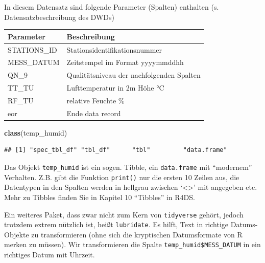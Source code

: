 \documentclass[]{book}
\newenvironment{Shaded}{\begin{snugshade}}{\end{snugshade}}
\newcommand{\KeywordTok}[1]{\textcolor[rgb]{0.13,0.29,0.53}{\textbf{#1}}}
\newcommand{\NormalTok}[1]{#1}
\newcommand{\OperatorTok}[1]{\textcolor[rgb]{0.81,0.36,0.00}{\textbf{#1}}}
\newcommand{\StringTok}[1]{\textcolor[rgb]{0.31,0.60,0.02}{#1}}
\begin{document}
In diesem Datensatz sind folgende Parameter (Spalten) enthalten (s. Datensatzbeschreibung des DWDs)

\begin{longtable}[]{@{}ll@{}}
\toprule
Parameter & Beschreibung\tabularnewline
\midrule
\endhead
STATIONS\_ID & Stationsidentifikationsnummer\tabularnewline
MESS\_DATUM & Zeitstempel im Format yyyymmddhh\tabularnewline
QN\_9 & Qualitätsniveau der nachfolgenden Spalten\tabularnewline
TT\_TU & Lufttemperatur in 2m Höhe °C\tabularnewline
RF\_TU & relative Feuchte \%\tabularnewline
eor & Ende data record\tabularnewline
\bottomrule
\end{longtable}

\begin{Shaded}
\begin{Highlighting}[]
\KeywordTok{class}\NormalTok{(temp_humid)}
\end{Highlighting}
\end{Shaded}

\begin{verbatim}
## [1] "spec_tbl_df" "tbl_df"      "tbl"         "data.frame"
\end{verbatim}

Das Objekt \texttt{temp\_humid} ist ein sogen. Tibble, ein \texttt{data.frame} mit ``modernem'' Verhalten. Z.B. gibt die Funktion \texttt{print()} nur die ersten 10 Zeilen aus, die Datentypen in den Spalten werden in hellgrau zwischen `\textless{}\textgreater{}' mit angegeben etc. Mehr zu Tibbles finden Sie in Kapitel 10 ``Tibbles'' in R4DS.

Ein weiteres Paket, dass zwar nicht zum Kern von \texttt{tidyverse} gehört, jedoch trotzdem extrem nützlich ist, heißt \texttt{lubridate}. Es hilft, Text in richtige Datums-Objekte zu transformieren (ohne sich die kryptischen Datumsformate von R merken zu müssen). Wir transformieren die Spalte \texttt{temp\_humid\$MESS\_DATUM} in ein richtiges Datum mit Uhrzeit.

\begin{Shaded}
\end{Shaded}
\end{document}
